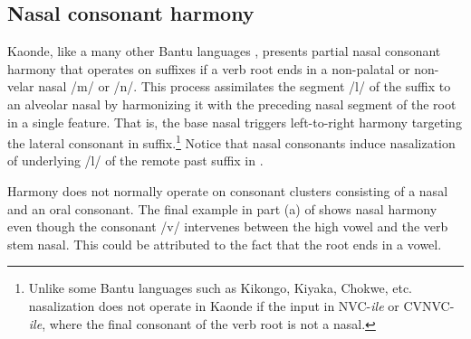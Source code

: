 \documentclass[output=paper]{langsci/langscibook}
\begin{document}
\subsection{Nasal consonant harmony}

 
Kaonde, like a many other Bantu languages \citep{greenberg1951}, presents partial nasal consonant harmony that operates on suffixes if a verb root ends in a non-palatal or non-velar nasal /m/ or /n/. This process assimilates the segment /l/ of the suffix to an alveolar nasal by harmonizing it with the preceding nasal segment of the root in a single feature. That is, the base nasal triggers left-to-right harmony targeting the lateral consonant in suffix.\footnote{Unlike some Bantu languages such as Kikongo, Kiyaka, Chokwe, etc. nasalization does not operate in Kaonde if the input in NVC-\textit{ile} or CVNVC-\textit{ile}, where the final consonant of the verb root is not a nasal.} Notice that nasal consonants induce nasalization of underlying /l/ of the remote past suffix in . 
 

 
Harmony does not normally operate on consonant clusters consisting of a nasal and an oral consonant. The final example in part (a) of  shows nasal harmony even though the consonant /v/ intervenes between the high vowel and the verb stem nasal. This could be attributed to the fact that the root ends in a vowel. 
\end{document}
